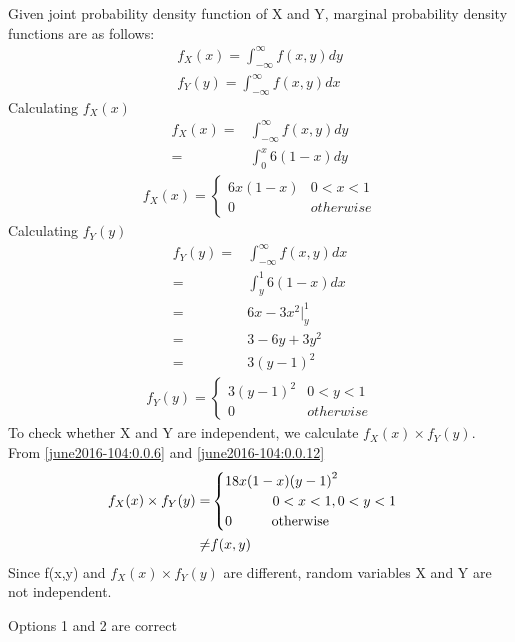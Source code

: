 Given joint probability density function of X and Y, marginal probability density functions are as follows:
\begin{align}
    f_X(x) = \int_{-\infty}^{\infty} f(x,y) dy \\[0.4cm]
    f_Y(y) = \int_{-\infty}^{\infty} f(x,y) dx
\end{align}
Calculating $f_X(x)$
\begin{align}
    f_X(x) = & \int_{-\infty}^{\infty} f(x,y) dy \\
    =        & \int_{0}^{x} 6(1-x) dy            
\end{align}
\begin{align}
    f_X(x) =
    \begin{cases}
        6x(1-x) & 0<x<1     \label{june2016-104:0.0.6}\\
        0       & otherwise
    \end{cases}
\end{align}
Calculating $f_Y(y)$
\begin{align}
    f_Y(y) = & \int_{-\infty}^{\infty} f(x,y) dx \\
    =        & \int_{y}^{1} 6(1-x) dx\\
    =        & 6x -3{x}^2 \big|_{y}^{1}\\
    =        & 3 - 6y + 3y^{2}\\
    =        & 3{(y-1)}^{2}      
\end{align}
\begin{align}
    f_Y(y) =
    \begin{cases}
        3{(y-1)}^{2}  & 0<y<1     \label{june2016-104:0.0.12}\\
        0       & otherwise
    \end{cases}
\end{align}
To check whether X and Y are independent, we calculate $f_X(x) \times f_Y(y)$. From \eqref{june2016-104:0.0.6} and \eqref{june2016-104:0.0.12}
\begin{align}
    f_X(x) \times f_Y(y) = &
    \begin{cases}
        18x(1-x){(y-1)}^{2}  \\ \hspace{1.2cm}0<x<1,0<y<1\\
        0 \hspace{1cm} \text{otherwise}
    \end{cases}\\
    \neq & f(x,y)
\end{align}
Since f(x,y) and $f_X(x)\times f_Y(y)$ are different, random variables X and Y are not independent.
\begin{center}
    Options 1 and 2 are correct
\end{center}